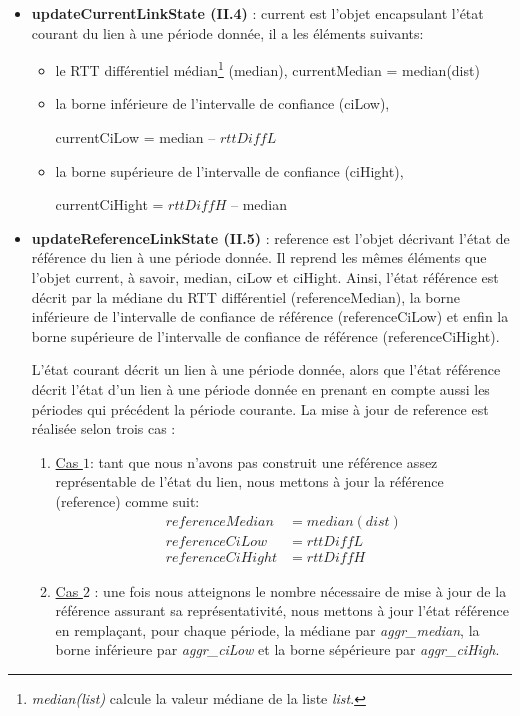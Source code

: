 \begin{itemize}
	
	\item \textbf{updateCurrentLinkState (II.4)} :  {\color{gray}current}  est l'objet encapsulant  l'état courant du lien à une période donnée, il a
	les éléments suivants:
	
	\begin{itemize}[label=$\square$]
		\item le RTT différentiel médian\footnote{\textit{median(list)} calcule la valeur médiane de la liste \textit{list}. } ({\color{gray}median}),
		{\color{gray}currentMedian} = median(dist) 
		
		\item  la borne inférieure de l'intervalle de confiance ({\color{gray}ciLow}),
		
		{\color{gray}currentCiLow} = {\color{gray}median} --  $ rttDiffL $
		
		\item   la borne supérieure de l'intervalle de confiance ({\color{gray}ciHight}),
		
		{\color{gray}currentCiHight} =  $ rttDiffH$ --  {\color{gray}median}
		
	\end{itemize}
	
	\item \textbf{ updateReferenceLinkState (II.5)} :  {\color{gray}reference}  est l'objet décrivant l'état de référence du lien à une période donnée. Il reprend les mêmes éléments que  l'objet {\color{gray}current}, à savoir, {\color{gray}median}, {\color{gray}ciLow} et {\color{gray}ciHight}. Ainsi, l'état référence est décrit par la médiane du RTT différentiel ({\color{gray}referenceMedian}), la borne inférieure de l'intervalle de confiance de référence ({\color{gray}referenceCiLow}) et enfin la borne supérieure de l'intervalle de confiance de référence ({\color{gray}referenceCiHight}).
	
	L'état courant décrit un lien à une période donnée, alors que l'état référence décrit l'état d'un lien à une période donnée en prenant en compte aussi les périodes qui précédent la période courante. La mise à jour de {\color{gray}reference}  est réalisée selon trois cas :
	
	\begin{enumerate}
		\item \underline{Cas $1$}: tant que nous n'avons pas construit une référence assez représentable de l'état du lien,  nous mettons à jour la référence ({\color{gray}reference}) comme suit: 
		\begin{align}
		referenceMedian &= median(dist)\\
		referenceCiLow &= rttDiffL\\
		referenceCiHight& = rttDiffH
		\end{align}
		\item \underline{Cas $2$} : une fois nous atteignons le nombre nécessaire de  mise à jour de la référence assurant sa représentativité, nous mettons à jour l'état référence en remplaçant, pour chaque période, la médiane par \textit{ aggr\_median}, la borne inférieure  par  \textit{aggr\_ciLow} et la borne sépérieure par \textit{aggr\_ciHigh}.
		\begin{itemize}
			

\end{itemize}
\end{enumerate}
\end{itemize}
